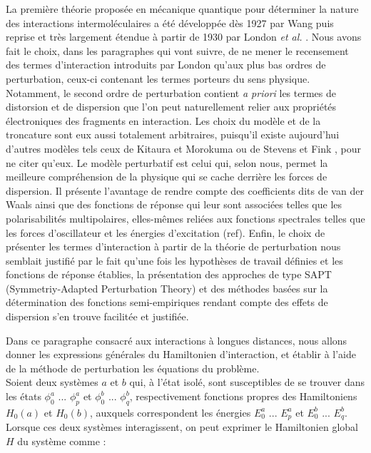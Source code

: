 	
	La première théorie proposée en mécanique quantique pour déterminer la nature des interactions intermoléculaires a été développée dès 1927 par Wang \cite{wang1927mutual} puis reprise et très largement étendue à partir de 1930 par London \textit{et al.} \cite{london1930z}. Nous avons fait le choix, dans les paragraphes qui vont suivre, de ne mener le recensement des termes d’interaction introduits par London qu'aux plus bas ordres de perturbation, ceux-ci contenant les termes porteurs du sens physique. Notamment, le second ordre de perturbation contient \textit{a priori} les termes de distorsion et de dispersion que l’on peut naturellement relier aux propriétés électroniques des fragments en interaction. Les choix du modèle et de la troncature sont eux aussi totalement arbitraires, puisqu’il existe aujourd’hui d’autres modèles tels ceux de Kitaura et Morokuma \cite{morokuma1977molecules} ou de Stevens et Fink \cite{stevens1987frozen}, pour ne citer qu’eux. Le modèle perturbatif est celui qui, selon nous, permet la meilleure compréhension de la physique qui se cache derrière les forces de dispersion. Il présente l'avantage de rendre compte des coefficients dits de van der Waals ainsi que des fonctions de réponse qui leur sont associées telles que les polarisabilités multipolaires, elles-mêmes reliées aux fonctions spectrales telles que les forces d’oscillateur et les énergies d’excitation (ref). Enfin, le choix de présenter les termes d’interaction à partir de la théorie de perturbation nous semblait justifié par le fait qu’une fois les hypothèses de travail définies et les fonctions de réponse établies, la présentation des approches de type SAPT (Symmetriy-Adapted Perturbation Theory) et des méthodes basées sur la détermination des fonctions semi-empiriques rendant compte des effets de dispersion s’en trouve facilitée et justifiée.
	
	
	Dans ce paragraphe consacré aux interactions à longues distances, nous allons donner les expressions générales du Hamiltonien d'interaction, et établir à l'aide de la méthode de perturbation les équations du problème.\\ 
	
	Soient deux systèmes $a$ et $b$ qui, à l'état isolé, sont susceptibles de se trouver dans les états $\phi_{0}^{a}$ ... $\phi_{p}^{a}$ et $\phi_{0}^{b}$ ... $\phi_{q}^{b}$, respectivement fonctions propres des Hamiltoniens $H_{0}(a)$ et $H_{0}(b)$, auxquels correspondent les énergies $E_{0}^{a}$ ... $E_{p}^{a}$ et $E_{0}^{b}$ ... $E_{q}^{b}$. Lorsque ces deux systèmes interagissent, on peut exprimer le Hamiltonien global $H$ du système comme : 
	
